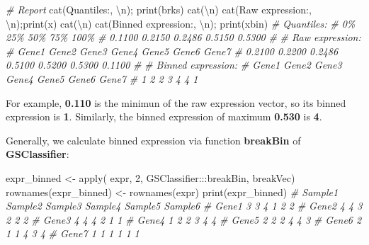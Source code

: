 \documentclass[
  12pt,
]{book}
\newenvironment{Shaded}{\begin{snugshade}}{\end{snugshade}}
\newcommand{\CommentTok}[1]{\textcolor[rgb]{0.56,0.35,0.01}{\textit{#1}}}
\newcommand{\DecValTok}[1]{\textcolor[rgb]{0.00,0.00,0.81}{#1}}
\newcommand{\FunctionTok}[1]{\textcolor[rgb]{0.00,0.00,0.00}{#1}}
\newcommand{\NormalTok}[1]{#1}
\newcommand{\OtherTok}[1]{\textcolor[rgb]{0.56,0.35,0.01}{#1}}
\newcommand{\SpecialCharTok}[1]{\textcolor[rgb]{0.00,0.00,0.00}{#1}}
\newcommand{\StringTok}[1]{\textcolor[rgb]{0.31,0.60,0.02}{#1}}
\begin{document}
\begin{Shaded}
\begin{Highlighting}[]
\CommentTok{\# Report}
\FunctionTok{cat}\NormalTok{(}\StringTok{\textquotesingle{}Quantiles:\textquotesingle{}}\NormalTok{, }\StringTok{\textquotesingle{}}\SpecialCharTok{\textbackslash{}n}\StringTok{\textquotesingle{}}\NormalTok{); }\FunctionTok{print}\NormalTok{(brks)}
\FunctionTok{cat}\NormalTok{(}\StringTok{\textquotesingle{}}\SpecialCharTok{\textbackslash{}n}\StringTok{\textquotesingle{}}\NormalTok{)}
\FunctionTok{cat}\NormalTok{(}\StringTok{\textquotesingle{}Raw expression:\textquotesingle{}}\NormalTok{, }\StringTok{\textquotesingle{}}\SpecialCharTok{\textbackslash{}n}\StringTok{\textquotesingle{}}\NormalTok{);}\FunctionTok{print}\NormalTok{(x)}
\FunctionTok{cat}\NormalTok{(}\StringTok{\textquotesingle{}}\SpecialCharTok{\textbackslash{}n}\StringTok{\textquotesingle{}}\NormalTok{)}
\FunctionTok{cat}\NormalTok{(}\StringTok{\textquotesingle{}Binned expression:\textquotesingle{}}\NormalTok{, }\StringTok{\textquotesingle{}}\SpecialCharTok{\textbackslash{}n}\StringTok{\textquotesingle{}}\NormalTok{); }\FunctionTok{print}\NormalTok{(xbin)}
\CommentTok{\# Quantiles: }
\CommentTok{\#     0\%    25\%    50\%    75\%   100\% }
\CommentTok{\# 0.1100 0.2150 0.2486 0.5150 0.5300 }
\CommentTok{\# }
\CommentTok{\# Raw expression: }
\CommentTok{\#  Gene1  Gene2  Gene3  Gene4  Gene5  Gene6  Gene7 }
\CommentTok{\# 0.2100 0.2200 0.2486 0.5100 0.5200 0.5300 0.1100 }
\CommentTok{\# }
\CommentTok{\# Binned expression: }
\CommentTok{\# Gene1 Gene2 Gene3 Gene4 Gene5 Gene6 Gene7 }
\CommentTok{\#     1     2     2     3     4     4     1}
\end{Highlighting}
\end{Shaded}

For example, \textbf{0.110} is the minimun of the raw expression vector, so its binned expression is \textbf{1}. Similarly, the binned expression of maximum \textbf{0.530} is \textbf{4}.

Generally, we calculate binned expression via function \textbf{breakBin} of \textbf{GSClassifier}:

\begin{Shaded}
\begin{Highlighting}[]
\NormalTok{expr\_binned }\OtherTok{\textless{}{-}} \FunctionTok{apply}\NormalTok{(}
\NormalTok{  expr, }\DecValTok{2}\NormalTok{, }
\NormalTok{  GSClassifier}\SpecialCharTok{:::}\NormalTok{breakBin,}
\NormalTok{  breakVec)}
\FunctionTok{rownames}\NormalTok{(expr\_binned) }\OtherTok{\textless{}{-}} \FunctionTok{rownames}\NormalTok{(expr)}
\FunctionTok{print}\NormalTok{(expr\_binned)}
\CommentTok{\#       Sample1 Sample2 Sample3 Sample4 Sample5 Sample6}
\CommentTok{\# Gene1       3       3       4       1       2       2}
\CommentTok{\# Gene2       4       4       3       2       2       2}
\CommentTok{\# Gene3       4       4       4       2       1       1}
\CommentTok{\# Gene4       1       2       2       3       4       4}
\CommentTok{\# Gene5       2       2       2       4       4       3}
\CommentTok{\# Gene6       2       1       1       4       3       4}
\CommentTok{\# Gene7       1       1       1       1       1       1}
\end{Highlighting}
\end{Shaded}
\end{document}
